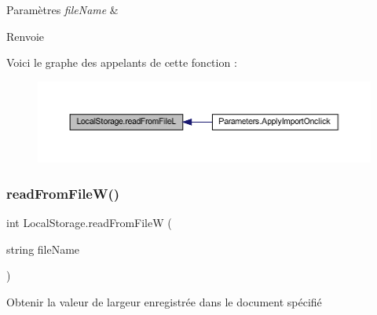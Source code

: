 \begin{DoxyParams}{Paramètres}
{\em file\+Name} & \\
\hline
\end{DoxyParams}
\begin{DoxyReturn}{Renvoie}

\end{DoxyReturn}
Voici le graphe des appelants de cette fonction \+:
\nopagebreak
\begin{figure}[H]
\begin{center}
\leavevmode
\includegraphics[width=350pt]{class_local_storage_a2216bc871c8298023f62119bcdf7edb4_icgraph}
\end{center}
\end{figure}
\mbox{\label{class_local_storage_aef684ee38f8d4dccf157503ec6d04a7a}} 
\subsubsection{\texorpdfstring{read\+From\+File\+W()}{readFromFileW()}}
{\footnotesize\ttfamily int Local\+Storage.\+read\+From\+FileW (\begin{DoxyParamCaption}\item[{string}]{file\+Name }\end{DoxyParamCaption})\hspace{0.3cm}{\ttfamily [inline]}}



Obtenir la valeur de largeur enregistrée dans le document spécifié 


